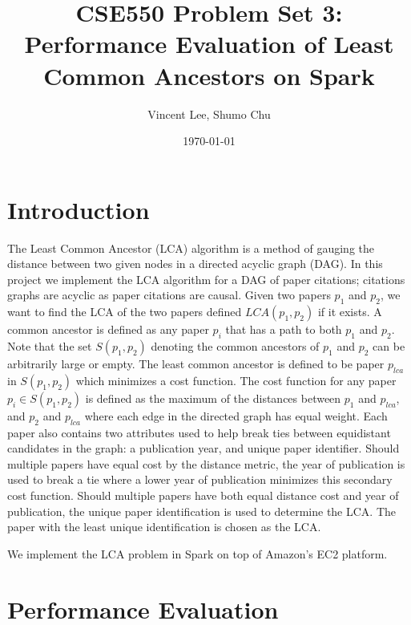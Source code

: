 \documentclass{article}
\begin{document}
\title{CSE550 Problem Set 3: Performance Evaluation of Least Common Ancestors on Spark}
\author{Vincent Lee, Shumo Chu}
\date{\today}

\maketitle

\tableofcontents


\section{Introduction}

The Least Common Ancestor (LCA) algorithm is a method of gauging the distance between two given nodes in a directed acyclic graph (DAG).
In this project we implement the LCA algorithm for a DAG of paper citations; citations graphs are acyclic as paper citations are causal.
Given two papers $p_1$ and $p_2$, we want to find the LCA of the two papers defined $LCA(p_1, p_2)$ if it exists.
A common ancestor is defined as any paper $p_i$ that has a path to both $p_1$ and $p_2$.
Note that the set $S(p_1, p_2)$ denoting the common ancestors of $p_1$ and $p_2$ can be arbitrarily large or empty.
The least common ancestor is defined to be paper $p_{lca}$ in $S(p_1, p_2)$ which minimizes a cost function.
The cost function for any paper $p_i \in S(p_1, p_2)$ is defined as the maximum of the distances between $p_1$ and $p_{lca}$, and $p_2$ and $p_{lca}$ where each edge in the directed graph has equal weight.
Each paper also contains two attributes used to help break ties between equidistant candidates in the graph: a publication year, and unique paper identifier.
Should multiple papers have equal cost by the distance metric, the year of publication is used to break a tie where a lower year of publication minimizes this secondary cost function.
Should multiple papers have both equal distance cost and year of publication, the unique paper identification is used to determine the LCA.
The paper with the least unique identification is chosen as the LCA.

We implement the LCA problem in Spark on top of Amazon's EC2 platform.

\section{Performance Evaluation}
\end{document}
